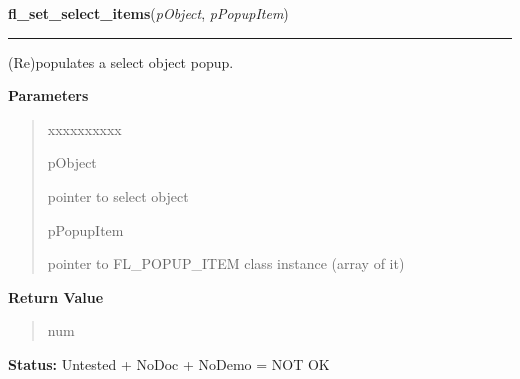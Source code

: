     \vspace{0.5ex}

\hspace{.8\funcindent}\begin{boxedminipage}{\funcwidth}

    \raggedright \textbf{fl\_set\_select\_items}(\textit{pObject}, \textit{pPopupItem})

    \vspace{-1.5ex}

    \rule{\textwidth}{0.5\fboxrule}
\setlength{\parskip}{2ex}
    (Re)populates a select object popup.

\setlength{\parskip}{1ex}
      \textbf{Parameters}
      \vspace{-1ex}

      \begin{quote}
        \begin{Ventry}{xxxxxxxxxx}

          \item[pObject]

          pointer to select object

          \item[pPopupItem]

          pointer to FL\_POPUP\_ITEM class instance (array of it)

        \end{Ventry}

      \end{quote}

      \textbf{Return Value}
    \vspace{-1ex}

      \begin{quote}
      num

      \end{quote}

\textbf{Status:} Untested + NoDoc + NoDemo = NOT OK



    \end{boxedminipage}

    \label{xformslib:library:fl_get_select_popup}

    \vspace{0.5ex}

